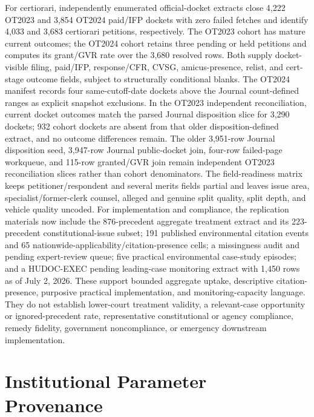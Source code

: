 \documentclass[
    journal=jlc,
    manuscript=research-article,
    year=2026,
  ]{cup-journal}
\begin{document}
For certiorari, independently enumerated official-docket extracts close 4,222 OT2023 and 3,854 OT2024 paid/IFP dockets with zero failed fetches and identify 4,033 and 3,683 certiorari petitions, respectively. The OT2023 cohort has mature current outcomes; the OT2024 cohort retains three pending or held petitions and computes its grant/GVR rate over the 3,680 resolved rows. Both supply docket-visible filing, paid/IFP, response/CFR, CVSG, amicus-presence, relist, and cert-stage outcome fields, subject to structurally conditional blanks. The OT2024 manifest records four same-cutoff-date dockets above the Journal count-defined ranges as explicit snapshot exclusions. In the OT2023 independent reconciliation, current docket outcomes match the parsed Journal disposition slice for 3,290 dockets; 932 cohort dockets are absent from that older disposition-defined extract, and no outcome differences remain. The older 3,951-row Journal disposition seed, 3,947-row Journal public-docket join, four-row failed-page workqueue, and 115-row granted/GVR join remain independent OT2023 reconciliation slices rather than cohort denominators. The field-readiness matrix keeps petitioner/respondent and several merits fields partial and leaves issue area, specialist/former-clerk counsel, alleged and genuine split quality, split depth, and vehicle quality uncoded. For implementation and compliance, the replication materials now include the 876-precedent aggregate treatment extract and its 223-precedent constitutional-issue subset; 191 published environmental citation events and 65 nationwide-applicability/citation-presence cells; a missingness audit and pending expert-review queue; five practical environmental case-study episodes; and a HUDOC-EXEC pending leading-case monitoring extract with 1,450 rows as of July 2, 2026. These support bounded aggregate uptake, descriptive citation-presence, purposive practical implementation, and monitoring-capacity language. They do not establish lower-court treatment validity, a relevant-case opportunity or ignored-precedent rate, representative constitutional or agency compliance, remedy fidelity, government noncompliance, or emergency downstream implementation.

\appendix

\section{Institutional Parameter Provenance}
\label{app:provenance}
\end{document}
